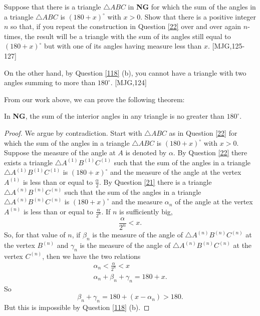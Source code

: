 \begin{question}
\label{121} Suppose that there is a triangle $\triangle ABC$ in
\textbf{NG} for which the sum of the angles in a triangle $\triangle ABC$ is
$\left( 180+x\right)^\circ$ with $x>0$. Show that there is a positive
integer $n$ so that, if you repeat the construction in
Question \ref{22} over and over again $n$-times, the result will be a
triangle with the sum of its angles still equal to $\left(
180+x\right)^\circ$ but with one of its angles having measure less
than $x$. [MJG,125-127]
\end{question}

\begin{question}\label{122} 
On the other hand, by Question \ref{118} (b), you cannot have a triangle
with two angles summing to more than $180^\circ$. [MJG,124] 
\end{question}

From our work above, we can prove the following theorem:

\begin{theorem}
In \textbf{NG}, the sum of the interior angles in any triangle is no greater
than $180^\circ$.
\end{theorem}

\begin{proof}
We argue by contradiction. Start with $\triangle ABC$ as in Question \ref{22}
for which the sum of the angles in a triangle $\triangle ABC$ is $\left(
180+x\right)^\circ$ with $x>0$. Suppose the measure of the angle at $A$ is denoted by $\alpha$.
By Question \ref{22} there exists a triangle $\triangle A^{\left(  1\right)
}B^{\left(  1\right)  }C^{\left(  1\right)  }$ such that the sum of the angles
in a triangle $\triangle A^{\left(  1\right)  }B^{\left(  1\right)
}C^{\left(  1\right)  }$ is $\left(  180+x\right)^\circ$ and the measure of the angle at the vertex $A^{\left(  1\right)  }$ is less
than or equal to $\frac{\alpha}{2}$. By Question \ref{21} there is a triangle
$\triangle A^{\left(  n\right)  }B^{\left(  n\right)  }C^{\left(  n\right)  }$
such that the sum of the angles in a triangle $\triangle A^{\left(  n\right)
}B^{\left(  n\right)  }C^{\left(  n\right)  }$ is $\left(  180+x\right)^\circ$ and the measure $\alpha_{n}$ of the angle at the vertex $A^{\left(
n\right)  }$ is less than or equal to $\frac{\alpha}{2^{n}}$. If $n$ is
sufficiently big,%
\[
\frac{\alpha}{2^{n}}<x.
\]
So, for that value of $n$, if $\beta_{n}$ is the measure of the angle of
$\triangle A^{\left(  n\right)  }B^{\left(  n\right)  }C^{\left(  n\right)  }$
at the vertex $B^{\left(  n\right)  }$ and $\gamma_{n}$ is the measure of the
angle of $\triangle A^{\left(  n\right)  }B^{\left(  n\right)  }C^{\left(
n\right)  }$ at the vertex $C^{\left(  n\right)  }$, then we have the two
relations%
\begin{gather*}
\alpha_{n}<\frac{\alpha}{2^{n}}<x\\
\alpha_{n}+\beta_{n}+\gamma_{n}=180+x.
\end{gather*}
So%
\[
\beta_{n}+\gamma_{n}=180+\left(  x-\alpha_{n}\right)  >180.
\]
But this is impossible by Question \ref{118} (b).
\end{proof}

